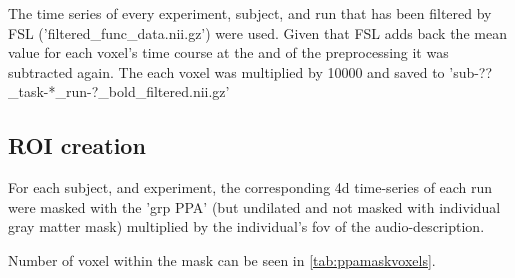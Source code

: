 
%
The time series of every experiment, subject, and run that has been filtered
by FSL ('filtered\_func\_data.nii.gz') were used.
%
Given that FSL adds back the mean value for each voxel's time course at the
and of the preprocessing it was subtracted again.
%
The each voxel was multiplied by 10000%
and saved to 'sub-??\_task-*\_run-?\_bold\_filtered.nii.gz'

\subsection{ROI creation}







For each subject, and experiment, the corresponding 4d time-series of each run
were masked with the 'grp PPA' (but undilated and not masked with individual
gray matter mask) multiplied by the individual's \ac{fov} of the
audio-description.

%
Number of voxel within the mask can be seen in \ref{tab:ppamaskvoxels}.

